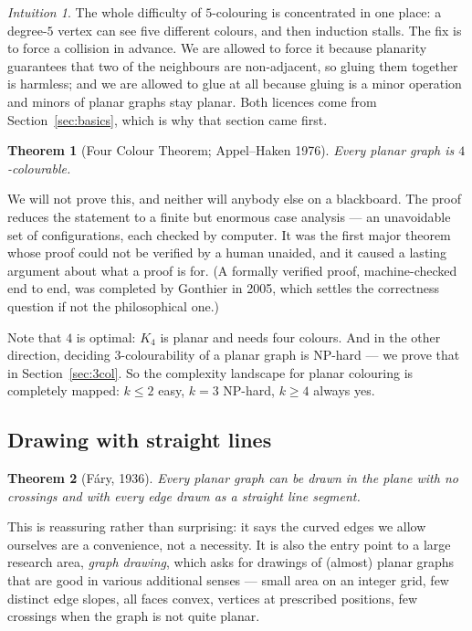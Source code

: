 \documentclass[11pt,a4paper]{article}
\theoremstyle{plain}
\newtheorem{theorem}{Theorem}[section]
\theoremstyle{definition}
\theoremstyle{remark}
\newtheorem*{intuition}{Intuition}
\begin{document}
\begin{intuition}
The whole difficulty of $5$-colouring is concentrated in one place: a
degree-$5$ vertex can see five different colours, and then induction stalls.
The fix is to force a collision in advance. We are allowed to force it because
planarity guarantees that two of the neighbours are non-adjacent, so gluing
them together is harmless; and we are allowed to glue at all because gluing is
a minor operation and minors of planar graphs stay planar. Both licences come
from Section~\ref{sec:basics}, which is why that section came first.
\end{intuition}

\begin{theorem}[Four Colour Theorem; Appel--Haken 1976]
Every planar graph is $4$-colourable.
\end{theorem}

We will not prove this, and neither will anybody else on a blackboard. The
proof reduces the statement to a finite but enormous case analysis --- an
unavoidable set of configurations, each checked by computer. It was the first
major theorem whose proof could not be verified by a human unaided, and it
caused a lasting argument about what a proof is for. (A formally verified
proof, machine-checked end to end, was completed by Gonthier in 2005, which
settles the correctness question if not the philosophical one.)

Note that $4$ is optimal: $K_4$ is planar and needs four colours. And in the
other direction, deciding $3$-colourability of a planar graph is NP-hard ---
we prove that in Section~\ref{sec:3col}. So the complexity landscape for
planar colouring is completely mapped: $k \le 2$ easy, $k = 3$ NP-hard,
$k \ge 4$ always yes.

\subsection{Drawing with straight lines}

\begin{theorem}[Fáry, 1936]
Every planar graph can be drawn in the plane with no crossings and with every
edge drawn as a straight line segment.
\end{theorem}

This is reassuring rather than surprising: it says the curved edges we allow
ourselves are a convenience, not a necessity. It is also the entry point to a
large research area, \emph{graph drawing}, which asks for drawings of (almost)
planar graphs that are good in various additional senses --- small area on an
integer grid, few distinct edge slopes, all faces convex, vertices at
prescribed positions, few crossings when the graph is not quite planar.
\end{document}
